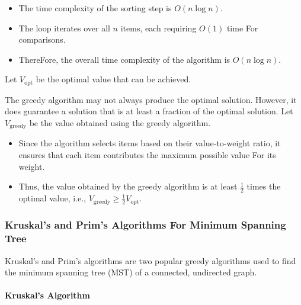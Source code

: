 \documentclass[12pt]{book} %
\begin{document}
\begin{itemize}
    \item The time complexity of the sorting step is $O(n \log n)$.
    \item The loop iterates over all $n$ items, each requiring $O(1)$ time For comparisons.
    \item ThereFore, the overall time complexity of the algorithm is $O(n \log n)$.
\end{itemize}

Let $V_{\text{opt}}$ be the optimal value that can be achieved.

The greedy algorithm may not always produce the optimal solution. However, it does guarantee a solution that is at least a fraction of the optimal solution. Let $V_{\text{greedy}}$ be the value obtained using the greedy algorithm.

\begin{itemize}
    \item Since the algorithm selects items based on their value-to-weight ratio, it ensures that each item contributes the maximum possible value For its weight.
    \item Thus, the value obtained by the greedy algorithm is at least $\frac{1}{2}$ times the optimal value, i.e., $V_{\text{greedy}} \geq \frac{1}{2} V_{\text{opt}}$.
\end{itemize}
\FloatBarrier %

\subsubsection{Kruskal's and Prim's Algorithms For Minimum Spanning Tree}

Kruskal's and Prim's algorithms are two popular greedy algorithms used to find the minimum spanning tree (MST) of a connected, undirected graph. 

\paragraph{Kruskal's Algorithm}
\end{document}
